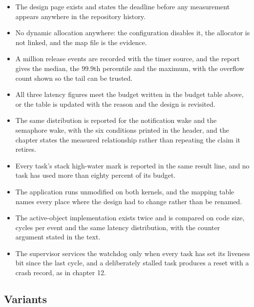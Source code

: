 \begin{itemize}
\item The design page exists and states the deadline before any measurement
appears anywhere in the repository history.
\item No dynamic allocation anywhere: the configuration disables it, the
allocator is not linked, and the map file is the evidence.
\item A million release events are recorded with the timer source, and the
report gives the median, the 99.9th percentile and the maximum, with the
overflow count shown so the tail can be trusted.
\item All three latency figures meet the budget written in the budget table
above, or the table is updated with the reason and the design is revisited.
\item The same distribution is reported for the notification wake and the
semaphore wake, with the six conditions printed in the header, and the chapter
states the measured relationship rather than repeating the claim it retires.
\item Every task's stack high-water mark is reported in the same result line,
and no task has used more than eighty percent of its budget.
\item The application runs unmodified on both kernels, and the mapping table
names every place where the design had to change rather than be renamed.
\item The active-object implementation exists twice and is compared on code
size, cycles per event and the same latency distribution, with the counter
argument stated in the text.
\item The supervisor services the watchdog only when every task has set its
liveness bit since the last cycle, and a deliberately stalled task produces a
reset with a crash record, as in chapter 12.
\end{itemize}

\subsection*{Variants}


